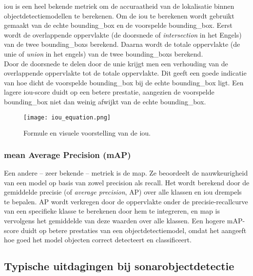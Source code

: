 \gls{iou} is een heel bekende metriek om de accuraatheid van de lokalisatie binnen objectdetectiemodellen te berekenen. Om de \gls{iou} te berekenen wordt gebruikt gemaakt van de echte \gls{bounding_box} en de voorspelde \gls{bounding_box}. Eerst wordt de overlappende oppervlakte (de doorsnede of \emph{intersection} in het Engels) van de twee \glspl{bounding_box} berekend. Daarna wordt de totale oppervlakte (de unie of \emph{union} in het engels) van de twee \glspl{bounding_box} berekend. \\

Door de doorsnede te delen door de unie krijgt men een verhouding van de overlappende oppervlakte tot de totale oppervlakte. Dit geeft een goede indicatie van hoe dicht de voorspelde \gls{bounding_box} bij de echte \gls{bounding_box} ligt. Een lagere \gls{iou}-score duidt op een betere prestatie, aangezien de voorspelde \gls{bounding_box} niet dan weinig afwijkt van de echte \gls{bounding_box}. \autocite{Rezatofighi_2019}

\begin{figure}[H]
    \centering
    \texttt{[image: iou\_equation.png]}
    \caption[Voorstelling van IoU.]{\label{fig:iou_equation}Formule en visuele voorstelling van de \acrfull{iou}.}
\end{figure}

\subsubsection{mean Average Precision (mAP)}

Een andere -- zeer bekende -- metriek is de \acrfull{map}. Ze beoordeelt de nauwkeurigheid van een model op basis van zowel \gls{precision} als \gls{recall}. Het wordt berekend door de gemiddelde precisie (of \emph{average precision}, AP) over alle klassen en \gls{iou} drempels te bepalen. AP wordt verkregen door de oppervlakte onder de precisie-recallcurve van een specifieke klasse te berekenen door hem te integreren, en \gls{map} is vervolgens het gemiddelde van deze waarden over alle klassen. Een hogere mAP-score duidt op betere prestaties van een objectdetectiemodel, omdat het aangeeft hoe goed het model objecten correct detecteert en classificeert. \autocite{Wang_2022}

\subsection{Typische uitdagingen bij sonarobjectdetectie}

